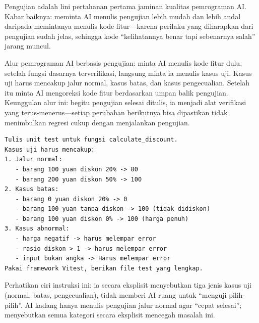 


Pengujian adalah lini pertahanan pertama jaminan kualitas pemrograman AI. Kabar baiknya: meminta AI menulis pengujian lebih mudah dan lebih andal daripada memintanya menulis kode fitur—karena perilaku yang diharapkan dari pengujian sudah jelas, sehingga kode “kelihatannya benar tapi sebenarnya salah” jarang muncul.

Alur pemrograman AI berbasis pengujian: minta AI menulis kode fitur dulu, setelah fungsi dasarnya terverifikasi, langsung minta ia menulis kasus uji. Kasus uji harus mencakup jalur normal, kasus batas, dan kasus pengecualian. Setelah itu minta AI mengoreksi kode fitur berdasarkan umpan balik pengujian. Keunggulan alur ini: begitu pengujian selesai ditulis, ia menjadi alat verifikasi yang terus-menerus—setiap perubahan berikutnya bisa dipastikan tidak menimbulkan regresi cukup dengan menjalankan pengujian.

\begin{lstlisting}
Tulis unit test untuk fungsi calculate_discount.
Kasus uji harus mencakup:
1. Jalur normal:
   - barang 100 yuan diskon 20% -> 80
   - barang 200 yuan diskon 50% -> 100
2. Kasus batas:
   - barang 0 yuan diskon 20% -> 0
   - barang 100 yuan tanpa diskon -> 100 (tidak didiskon)
   - barang 100 yuan diskon 0% -> 100 (harga penuh)
3. Kasus abnormal:
   - harga negatif -> harus melempar error
   - rasio diskon > 1 -> harus melempar error
   - input bukan angka -> Harus melempar error
Pakai framework Vitest, berikan file test yang lengkap.
\end{lstlisting}

Perhatikan ciri instruksi ini: ia secara eksplisit menyebutkan tiga jenis kasus uji (normal, batas, pengecualian), tidak memberi AI ruang untuk “menguji pilih-pilih”. AI kadang hanya menulis pengujian jalur normal agar “cepat selesai”; menyebutkan semua kategori secara eksplisit mencegah masalah ini.

